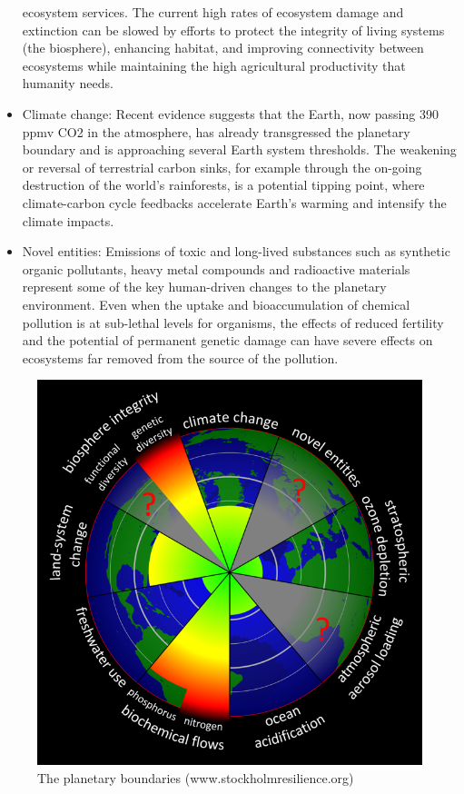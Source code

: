 \documentclass[12pt,oneside]{book}
\begin{document}
\begin{itemize}
  ecosystem services. The current high rates of ecosystem damage and
  extinction can be slowed by efforts to protect the integrity of living
  systems (the biosphere), enhancing habitat, and improving connectivity
  between ecosystems while maintaining the high agricultural
  productivity that humanity needs.
\item
  Climate change: Recent evidence suggests that the Earth, now passing
  390 ppmv CO2 in the atmosphere, has already transgressed the planetary
  boundary and is approaching several Earth system thresholds. The
  weakening or reversal of terrestrial carbon sinks, for example through
  the on-going destruction of the world's rainforests, is a potential
  tipping point, where climate-carbon cycle feedbacks accelerate Earth's
  warming and intensify the climate impacts.
\item
  Novel entities: Emissions of toxic and long-lived substances such as
  synthetic organic pollutants, heavy metal compounds and radioactive
  materials represent some of the key human-driven changes to the
  planetary environment. Even when the uptake and bioaccumulation of
  chemical pollution is at sub-lethal levels for organisms, the effects
  of reduced fertility and the potential of permanent genetic damage can
  have severe effects on ecosystems far removed from the source of the
  pollution.
\end{itemize}

\begin{figure}

{\centering \includegraphics[width=0.6\linewidth]{figures/chap1/planetary_boundaries} 

}

\caption{The planetary boundaries (www.stockholmresilience.org)}\label{fig:f1}
\end{figure}
\end{document}
